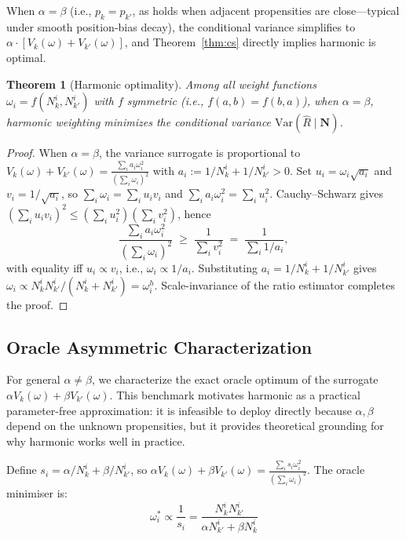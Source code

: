 \documentclass[sigconf]{acmart}
\newtheorem{theorem}{Theorem}
\begin{document}
When $\alpha = \beta$ (i.e., $p_k = p_{k'}$, as holds when adjacent propensities are close---typical under smooth position-bias decay), the conditional variance simplifies to $\alpha \cdot [V_k(\omega) + V_{k'}(\omega)]$, and Theorem~\ref{thm:cs} directly implies harmonic is optimal.

\begin{theorem}[Harmonic optimality]
\label{thm:optimality}
Among all weight functions $\omega_i = f(N_k^i, N_{k'}^i)$ with $f$ symmetric (i.e., $f(a,b) = f(b,a)$), when $\alpha = \beta$, harmonic weighting minimizes the conditional variance $\mathrm{Var}(\hat{R} \mid \mathbf{N})$.
\end{theorem}

\begin{proof}
When $\alpha = \beta$, the variance surrogate is proportional to
$V_k(\omega)+V_{k'}(\omega)=\frac{\sum_i a_i\omega_i^2}{(\sum_i \omega_i)^2}$
with $a_i := 1/N_k^i+1/N_{k'}^i > 0$. Set $u_i = \omega_i\sqrt{a_i}$ and
$v_i = 1/\sqrt{a_i}$, so $\sum_i \omega_i = \sum_i u_i v_i$ and
$\sum_i a_i\omega_i^2 = \sum_i u_i^2$. Cauchy--Schwarz gives
$(\sum_i u_i v_i)^2 \leq (\sum_i u_i^2)(\sum_i v_i^2)$, hence
\[
\frac{\sum_i a_i\omega_i^2}{(\sum_i \omega_i)^2}
\;\geq\;\frac{1}{\sum_i v_i^2}\;=\;\frac{1}{\sum_i 1/a_i},
\]
with equality iff $u_i \propto v_i$, i.e., $\omega_i \propto 1/a_i$.
Substituting $a_i = 1/N_k^i+1/N_{k'}^i$ gives
$\omega_i \propto N_k^i N_{k'}^i/(N_k^i+N_{k'}^i) = \omega_i^h$.
Scale-invariance of the ratio estimator completes the proof.
\end{proof}

\subsection{Oracle Asymmetric Characterization}
\label{sec:asymmetric_optimum}

For general $\alpha \neq \beta$, we characterize the exact oracle optimum of the surrogate $\alpha V_k(\omega)+\beta V_{k'}(\omega)$. This benchmark motivates harmonic as a practical parameter-free approximation: it is infeasible to deploy directly because $\alpha,\beta$ depend on the unknown propensities, but it provides theoretical grounding for why harmonic works well in practice.

Define $s_i = \alpha/N_k^i + \beta/N_{k'}^i$, so $\alpha V_k(\omega)+\beta V_{k'}(\omega) = \frac{\sum_i s_i \omega_i^2}{(\sum_i \omega_i)^2}$.
The oracle minimiser is:
\begin{equation}
\label{eq:omega_star}
\omega_i^* \propto \frac{1}{s_i} = \frac{N_k^i N_{k'}^i}{\alpha N_{k'}^i + \beta N_k^i}
\end{equation}
\end{document}
